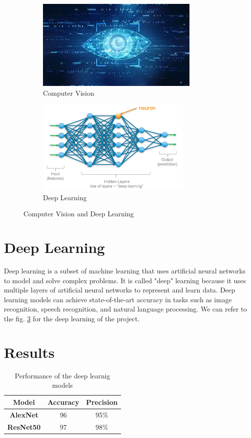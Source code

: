 \documentclass{article}
\begin{document}
\begin{figure}
    \centering
    \begin{subfigure}{0.4\textwidth}
        \includegraphics[scale = 0.5]{vision.jpg}
        \caption{Computer Vision}
        \label{fig:vision(a)}
    \end{subfigure}
    \begin{subfigure}{0.4\textwidth}
        \includegraphics[scale = 0.5]{deeplearning.png}
        \caption{Deep Learning}
        \label{fig:dlearning(b)}
        
    \end{subfigure}
    \caption{Computer Vision and Deep Learning}
    
\end{figure}
\section{Deep Learning}
Deep learning is a subset of machine learning that uses artificial neural networks to model and solve complex problems.
\cite{zhou2021blockchain} It is called "deep" learning because it uses multiple layers of artificial neural networks to represent and learn data. Deep learning models can achieve state-of-the-art accuracy in tasks such as image recognition, speech recognition, and natural language processing.
We can refer to the fig. \ref{fig:dlearning(b)} for the deep learning of the project.\\
\section{Results}
\begin{table}[h]
    \centering
    \begin{tabular}{|c|c|c|}
        \rowcolor{yellow}
        \hline
        \textbf{Model} & Accuracy & Precision\\
        \hline
        \hline
        \textbf{AlexNet} & 96 & 95\%\\
        \hline
        \textbf{ResNet50} & 97 & 98\%\\

    \hline
    \end{tabular}
    \caption{Performance of the deep learnig models}
\end{table}
\end{document}
